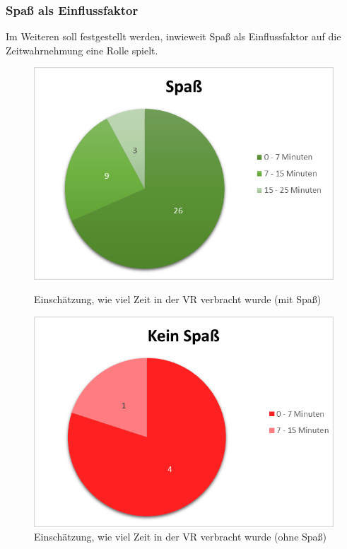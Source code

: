\documentclass{Paper}
\begin{document}
\subsubsection{Spaß als Einflussfaktor}
Im Weiteren soll festgestellt werden, inwieweit Spaß als Einflussfaktor auf die Zeitwahrnehmung eine Rolle spielt.



\begin{figure}[H]
\begin{minipage}[t]{0.49\linewidth}
	\includegraphics[scale=0.7]{../Diagramme/spass/spass.png}
	\caption{Einschätzung, wie viel Zeit in der VR verbracht wurde (mit Spaß)}
	\label{spass}
\end{minipage}
\hfill
\begin{minipage}[t]{0.49\linewidth}
	\includegraphics[scale=0.7]{../Diagramme/spass/keinSpass.png}
	\caption{Einschätzung, wie viel Zeit in der VR verbracht wurde (ohne Spaß)}
	\label{keinspass}
\end{minipage}
\end{figure}
\end{document}
